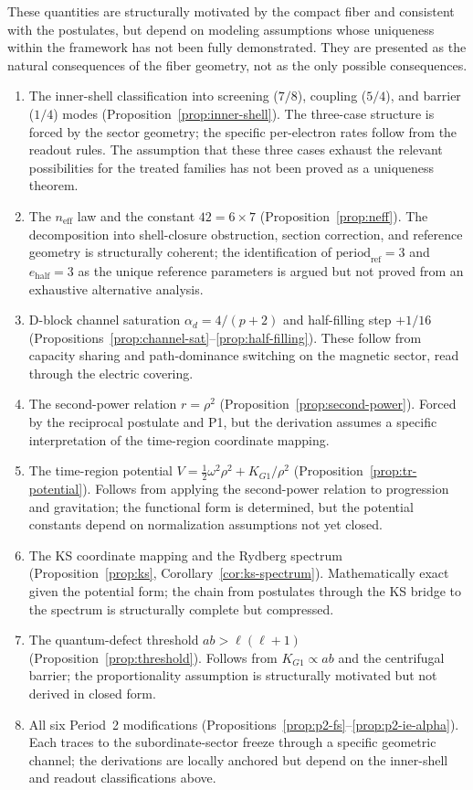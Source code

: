 \documentclass[11pt,a4paper]{article}
\begin{document}
These quantities are structurally motivated by the compact fiber and consistent with the postulates, but depend on modeling assumptions whose uniqueness within the framework has not been fully demonstrated. They are presented as the natural consequences of the fiber geometry, not as the only possible consequences.
\begin{enumerate}
\item The inner-shell classification into screening ($7/8$), coupling ($5/4$), and barrier ($1/4$) modes (Proposition~\ref{prop:inner-shell}). The three-case structure is forced by the sector geometry; the specific per-electron rates follow from the readout rules. The assumption that these three cases exhaust the relevant possibilities for the treated families has not been proved as a uniqueness theorem.
\item The $n_{\mathrm{eff}}$ law and the constant $42 = 6 \times 7$ (Proposition~\ref{prop:neff}). The decomposition into shell-closure obstruction, section correction, and reference geometry is structurally coherent; the identification of $\mathrm{period}_{\mathrm{ref}} = 3$ and $e_{\mathrm{half}} = 3$ as the unique reference parameters is argued but not proved from an exhaustive alternative analysis.
\item D-block channel saturation $\alpha_d = 4/(p+2)$ and half-filling step $+1/16$ (Propositions~\ref{prop:channel-sat}--\ref{prop:half-filling}). These follow from capacity sharing and path-dominance switching on the magnetic sector, read through the electric covering.
\item The second-power relation $r = \rho^2$ (Proposition~\ref{prop:second-power}). Forced by the reciprocal postulate and P1, but the derivation assumes a specific interpretation of the time-region coordinate mapping.
\item The time-region potential $V = \tfrac{1}{2}\omega^2\rho^2 + K_{G1}/\rho^2$ (Proposition~\ref{prop:tr-potential}). Follows from applying the second-power relation to progression and gravitation; the functional form is determined, but the potential constants depend on normalization assumptions not yet closed.
\item The KS coordinate mapping and the Rydberg spectrum (Proposition~\ref{prop:ks}, Corollary~\ref{cor:ks-spectrum}). Mathematically exact given the potential form; the chain from postulates through the KS bridge to the spectrum is structurally complete but compressed.
\item The quantum-defect threshold $ab > \ell(\ell+1)$ (Proposition~\ref{prop:threshold}). Follows from $K_{G1} \propto ab$ and the centrifugal barrier; the proportionality assumption is structurally motivated but not derived in closed form.
\item All six Period~2 modifications (Propositions~\ref{prop:p2-fs}--\ref{prop:p2-ie-alpha}). Each traces to the subordinate-sector freeze through a specific geometric channel; the derivations are locally anchored but depend on the inner-shell and readout classifications above.
\end{enumerate}
\end{document}
